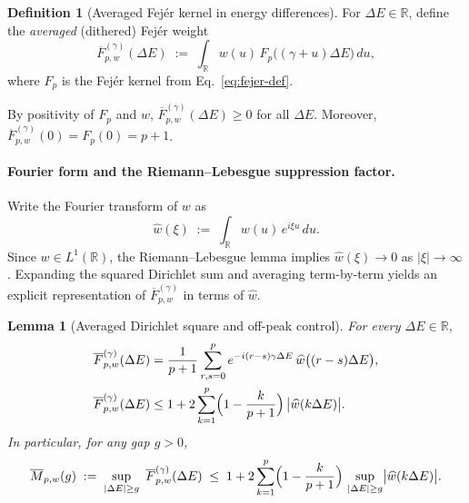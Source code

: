 \documentclass[a4paper,unpublished,onecolumn,11pt]{quantumarticle}
\newtheorem{lemma}[theorem]{Lemma}
\theoremstyle{definition}
\newtheorem{definition}[theorem]{Definition}
\theoremstyle{remark}
\begin{document}
\begin{definition}[Averaged Fej\'er kernel in energy differences]
\label{def:avg-fejer}
For $\Delta E\in\mathbb R$, define the \emph{averaged} (dithered) Fej\'er weight
\begin{equation}
\label{eq:avg-fejer-def}
\overline F_{p,w}^{(\gamma)}(\Delta E)
\;:=\;
\int_{\mathbb R} w(u)\,
F_p\!\bigl((\gamma+u)\Delta E\bigr)\,du,
\end{equation}
where $F_p$ is the Fej\'er kernel from Eq.~\eqref{eq:fejer-def}.
\end{definition}

\noindent
By positivity of $F_p$ and $w$, $\overline F_{p,w}^{(\gamma)}(\Delta E)\ge 0$ for all $\Delta E$.
Moreover, $\overline F_{p,w}^{(\gamma)}(0)=F_p(0)=p+1$.

\paragraph{Fourier form and the Riemann--Lebesgue suppression factor.}
Write the Fourier transform of $w$ as
\[
\widehat w(\xi)
\;:=\;
\int_{\mathbb R} w(u)\,e^{i\xi u}\,du.
\]
Since $w\in L^1(\mathbb R)$, the Riemann--Lebesgue lemma implies
$\widehat w(\xi)\to 0$ as $|\xi|\to\infty$ \cite{SteinShakarchi2003Fourier,Katznelson2004}.
Expanding the squared Dirichlet sum and averaging term-by-term yields an explicit
representation of $\overline F_{p,w}^{(\gamma)}$ in terms of $\widehat w$.

\begin{lemma}[Averaged Dirichlet square and off-peak control]
\label{lem:avg-fejer-fourier}
For every $\Delta E\in\mathbb R$,
\begin{align}
\label{eq:avg-fejer-fourier}
\overline F_{p,w}^{(\gamma)}(\Delta E)
&=
\frac{1}{p+1}\sum_{r,s=0}^{p}
e^{-i(r-s)\gamma\Delta E}\,
\widehat w\bigl((r-s)\Delta E\bigr),
\\
\label{eq:avg-fejer-bound-general}
\overline F_{p,w}^{(\gamma)}(\Delta E)
&\le
1
+
2\sum_{k=1}^{p}\Bigl(1-\frac{k}{p+1}\Bigr)\,
\bigl|\widehat w(k\Delta E)\bigr|.
\end{align}
In particular, for any gap $g>0$,
\begin{equation}
\label{eq:Mp-avg-def}
\overline M_{p,w}(g)
\;:=\;
\sup_{|\Delta E|\ge g}\ \overline F_{p,w}^{(\gamma)}(\Delta E)
\;\le\;
1
+
2\sum_{k=1}^{p}\Bigl(1-\frac{k}{p+1}\Bigr)\,
\sup_{|\Delta E|\ge g}\bigl|\widehat w(k\Delta E)\bigr|.
\end{equation}
\end{lemma}
\end{document}
